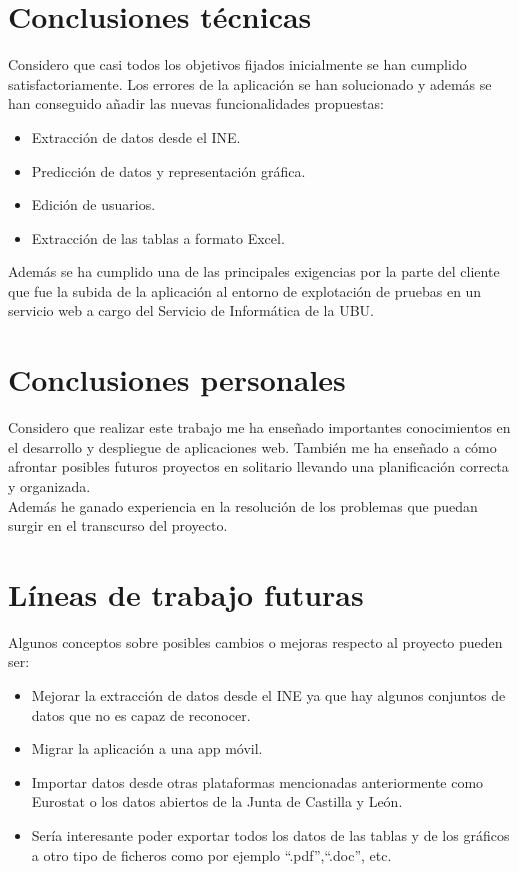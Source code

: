 \section{Conclusiones técnicas}
Considero que casi todos los objetivos fijados inicialmente se han cumplido satisfactoriamente. Los errores de la aplicación se han solucionado y además se han conseguido añadir las nuevas funcionalidades propuestas:
\begin{itemize}
    \item Extracción de datos desde el INE.
    \item Predicción de datos y representación gráfica.
    \item Edición de usuarios.
    \item Extracción de las tablas a formato Excel.
\end{itemize}
Además se ha cumplido una de las principales exigencias por la parte del cliente que fue la subida de la aplicación al entorno de explotación de pruebas en un servicio web a cargo del Servicio de Informática de la UBU.
\section{Conclusiones personales}
Considero que realizar este trabajo me ha enseñado importantes conocimientos en el desarrollo y despliegue de aplicaciones web. También me ha enseñado a cómo afrontar posibles futuros proyectos en solitario llevando una planificación correcta y organizada.\\
Además he ganado experiencia en la resolución de los problemas que puedan surgir en el transcurso del proyecto.\\
\section{Líneas de trabajo futuras}
Algunos conceptos sobre posibles cambios o mejoras respecto al proyecto pueden ser:
\begin{itemize}
    \item Mejorar la extracción de datos desde el INE ya que hay algunos conjuntos de datos que no es capaz de reconocer.
    \item Migrar la aplicación a una app móvil.
    \item Importar datos desde otras plataformas mencionadas anteriormente como Eurostat o los datos abiertos de la Junta de Castilla y León.
    \item Sería interesante poder exportar todos los datos de las tablas y de los gráficos a otro tipo de ficheros como por ejemplo “.pdf”,“.doc”, etc.
\end{itemize}